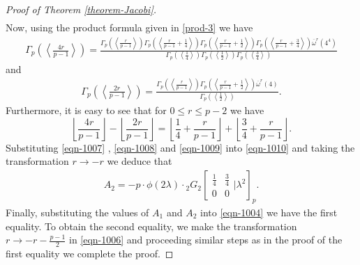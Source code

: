 \documentclass[10pt,a4paper]{amsart}
\begin{document}
\begin{proof}[Proof of Theorem \ref{theorem-Jacobi}]
\begin{align}
\end{align}
Now, using the product formula given in \eqref{prod-3} we have 
\begin{align}\label{eqn-1007}
   \Gamma_p\left(\left\langle\frac{4r}{p-1}\right\rangle\right)=\frac{\Gamma_p\left(\left\langle\frac{r}{p-1}\right\rangle\right)\Gamma_p\left(\left\langle\frac{r}{p-1}+\frac{1}{4}\right\rangle\right)\Gamma_p\left(\left\langle\frac{r}{p-1}+\frac{1}{2}\right\rangle\right)\Gamma_p\left(\left\langle\frac{r}{p-1}+\frac{3}{4}\right\rangle\right) {\overline\omega^r(4^4)}}{\Gamma_p\left(\left\langle\frac{1}{4}\right\rangle\right)\Gamma_p\left(\left\langle\frac{1}{2}\right\rangle\right)\Gamma_p\left(\left\langle\frac{3}{4}\right\rangle\right)} 
\end{align}
and
\begin{align}\label{eqn-1008}
   \Gamma_p\left(\left\langle\frac{2r}{p-1}\right\rangle\right)=\frac{\Gamma_p\left(\left\langle\frac{r}{p-1}\right\rangle\right)\Gamma_p\left(\left\langle\frac{r}{p-1}+\frac{1}{2}\right\rangle\right) {\overline\omega^r(4)}}{\Gamma_p\left(\left\langle\frac{1}{2}\right\rangle\right)}.
\end{align}
Furthermore, it is easy to see that for $0\leq r\leq p-2$ we have
\begin{equation}\label{eqn-1009}
    \left\lfloor\frac{4r}{p-1}\right\rfloor-\left\lfloor\frac{2r}{p-1}\right\rfloor=\left\lfloor\frac{1}{4}+\frac{r}{p-1}\right\rfloor+\left\lfloor\frac{3}{4}+\frac{r}{p-1}\right\rfloor.
\end{equation}
Substituting \eqref{eqn-1007} , \eqref{eqn-1008} and \eqref{eqn-1009} into \eqref{eqn-1010} and taking the transformation $r\rightarrow-r$ we deduce that
\begin{align}\label{eqn-1011}
A_2=-p\cdot  \phi(2\lambda)\cdot {_2G_2}\left[\begin{array}{cc}
 \frac{1}{4}    & \frac{3}{4} \\
  0    & 0  \end{array}|{\lambda^2}\right]_p.
\end{align}
Finally, substituting the values of $A_1$ and $A_2$ into \eqref{eqn-1004} we have the first equality. To obtain the second equality, we make the transformation $r\rightarrow -r-\frac{p-1}{2}$ in \eqref{eqn-1006} and proceeding similar steps as in the proof of the first equality we complete the proof.
\end{proof}
\end{document}
